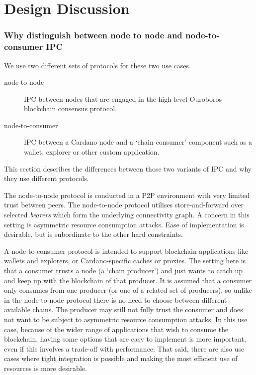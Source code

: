 \documentclass{report}
\theoremstyle{definition}{
  \newtheorem{lemma}{Lemma}[section] %
  \newtheorem{definition}[lemma]{Definition}
}
\theoremstyle{theorem}{
  \newtheorem{invariant}[lemma]{Invariant}
  \newtheorem{proofobligation}[lemma]{Proof Obligation}
}
\numberwithin{equation}{lemma}
\begin{document}
\section{Design Discussion}
\subsubsection{Why distinguish between node to node and node-to-consumer IPC}
\label{why_distinguish_protocols}
We use two different sets of protocols for these two use cases.

\begin{description}
\item[node-to-node] IPC between nodes that are engaged in the high level Ouroboros
      blockchain consensus protocol.
\item[node-to-consumer] IPC between a Cardano node and a `chain consumer' component such as a
      wallet, explorer or other custom application.
\end{description}

This section describes the differences between those two variants of IPC and why they use
different protocols.

The node-to-node protocol is conducted in a P2P environment
with very limited trust between peers. The node-to-node protocol utilises
store-and-forward over selected \emph{bearers} which form the underlying
connectivity graph. A concern in this setting is asymmetric resource
consumption attacks. Ease of implementation is desirable, but is
subordinate to the other hard constraints.

A node-to-consumer protocol is intended to support blockchain applications
like wallets and explorers, or Cardano-specific caches or proxies. The setting
here is that a consumer trusts a node (a `chain producer') and just wants to
catch up and keep up with the blockchain of that producer. It is assumed that
a consumer only consumes from one producer (or one of a related set of
producers), so unlike in the node-to-node protocol there is no need to choose
between different available chains. The producer may still not fully trust the
consumer and does not want to be subject to asymmetric resource
consumption attacks. In this use case, because of the wider range of
applications that wish to consume the blockchain, having some options that are
easy to implement is more important, even if this involves a trade-off with
performance. That said, there are also use cases where tight integration is
possible and making the most efficient use of resources is more desirable.
\end{document}
